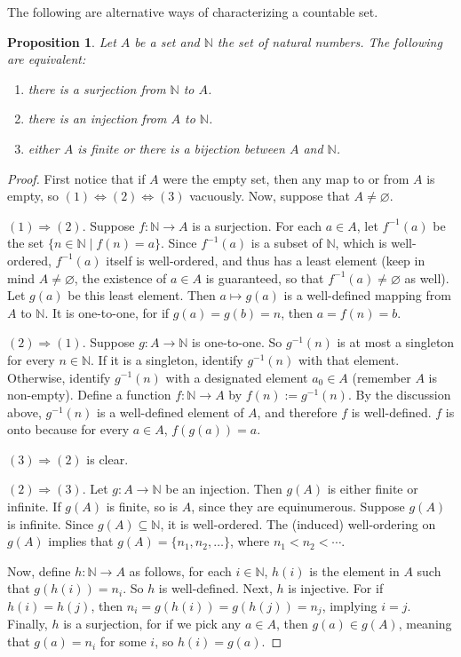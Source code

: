 \documentclass[12pt]{article}
\newtheorem{prop}{Proposition}
\begin{document}
The following are alternative ways of characterizing a countable set.

\begin{prop}  Let $A$ be a set and $\mathbb{N}$ the set of natural numbers.  The following are equivalent:
\begin{enumerate}
\item there is a surjection from $\mathbb{N}$ to $A$.
\item there is an injection from $A$ to $\mathbb{N}$.
\item either $A$ is finite or there is a bijection between $A$ and $\mathbb{N}$.
\end{enumerate}
\end{prop}

\begin{proof}  First notice that if $A$ were the empty set, then any map to or from $A$ is empty, so $(1)\Leftrightarrow (2) \Leftrightarrow (3)$ vacuously.  Now, suppose that $A \ne \varnothing$.

$(1)\Rightarrow (2)$.  Suppose $f: \mathbb{N}\to A$ is a surjection.  For each $a\in A$, let $f^{-1}(a)$ be the set $\lbrace n \in \mathbb{N} \mid f(n)=a\rbrace$.  Since $f^{-1}(a)$ is a subset of $\mathbb{N}$, which is well-ordered, $f^{-1}(a)$ itself is well-ordered, and thus has a least element (keep in mind $A\ne \varnothing$, the existence of $a\in A$ is guaranteed, so that $f^{-1}(a)\ne \varnothing$ as well).  Let $g(a)$ be this least element.  Then $a \mapsto g(a)$ is a well-defined mapping from $A$ to $\mathbb{N}$.  It is one-to-one, for if $g(a)=g(b)=n$, then $a=f(n)=b$.

$(2)\Rightarrow (1)$.  Suppose $g:A\to \mathbb{N}$ is one-to-one.  So $g^{-1}(n)$ is at most a singleton for every $n\in \mathbb{N}$.  If it is a singleton, identify $g^{-1}(n)$ with that element.  Otherwise, identify $g^{-1}(n)$ with a designated element $a_0\in A$ (remember $A$ is non-empty).  Define a function $f:\mathbb{N} \to A$ by $f(n):=g^{-1}(n)$.  By the discussion above, $g^{-1}(n)$ is a well-defined element of $A$, and therefore $f$ is well-defined.  $f$ is onto because for every $a\in A$, $f(g(a))=a$.

$(3)\Rightarrow (2)$ is clear.

$(2)\Rightarrow (3)$.  Let $g: A\to \mathbb{N}$ be an injection.  Then $g(A)$ is either finite or infinite.  If $g(A)$ is finite, so is $A$, since they are equinumerous.  Suppose $g(A)$ is infinite.  Since $g(A) \subseteq \mathbb{N}$, it is well-ordered.  The (induced) well-ordering on $g(A)$ implies that $g(A)=\lbrace n_1, n_2, \ldots \rbrace$, where $n_1 < n_2 < \cdots$.

Now, define $h: \mathbb{N}\to A$ as follows, for each $i\in \mathbb{N}$, $h(i)$ is the element in $A$ such that $g(h(i))=n_i$.  So $h$ is well-defined.  Next, $h$ is injective.  For if $h(i)=h(j)$, then $n_i = g(h(i))=g(h(j)) = n_j$, implying $i=j$.  Finally, $h$ is a surjection, for if we pick any $a\in A$, then $g(a)\in g(A)$, meaning that $g(a)=n_i$ for some $i$, so $h(i)=g(a)$.
\end{proof}
\end{document}
